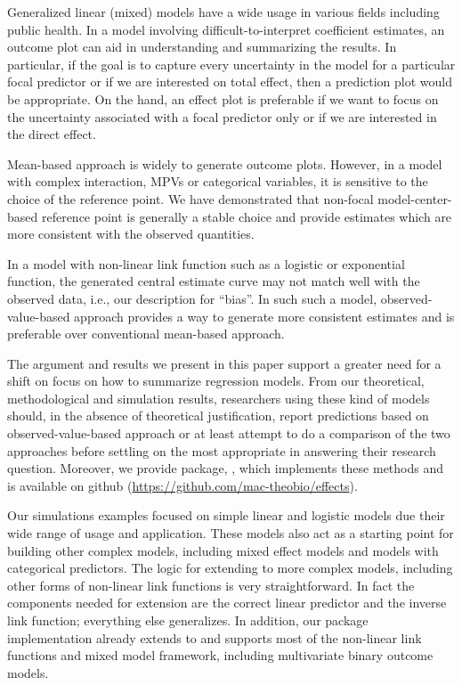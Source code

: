 Generalized linear (mixed) models have a wide usage in various fields including public health. In a model involving difficult-to-interpret coefficient estimates, an outcome plot can aid in understanding and summarizing the results. In particular, if the goal is to capture every uncertainty in the model for a particular focal predictor or if we are interested on total effect, then a prediction plot would be appropriate. On the hand, an effect plot is preferable if we want to focus on the uncertainty associated with a focal predictor only or if we are interested in the direct effect.

Mean-based approach is widely to generate outcome plots. However, in a model with complex interaction, MPVs or categorical variables, it is sensitive to the choice of the reference point. We have demonstrated that non-focal model-center-based reference point is generally a stable choice and provide estimates which are more consistent with the observed quantities.

In a model with non-linear link function such as a logistic or exponential function, the generated central estimate curve may not match well with the observed data, i.e., our description for ``bias''. In such such a model, observed-value-based approach provides a way to generate more consistent estimates and is preferable over conventional mean-based approach.

The argument and results we present in this paper support a greater need for a shift on focus on how to summarize regression models. From our theoretical, methodological and simulation results, researchers using these kind of models should, in the absence of theoretical justification, report predictions based on observed-value-based approach or at least attempt to do a comparison of the two approaches before settling on the most appropriate in answering their research question. Moreover, we provide  package, , which implements these methods and is available on github (\href{https://github.com/mac-theobio/effects}{https://github.com/mac-theobio/effects}).

Our simulations examples focused on simple linear and logistic models due their wide range of usage and application. These models also act as a starting point for building other complex models, including mixed effect models and models with categorical predictors. The logic for extending to more complex models, including other forms of non-linear link functions is very straightforward. In fact the components needed for extension are the correct linear predictor and the inverse link function; everything else generalizes. In addition, our  package implementation already extends to and supports most of the non-linear link functions and mixed model framework, including multivariate binary outcome models.

